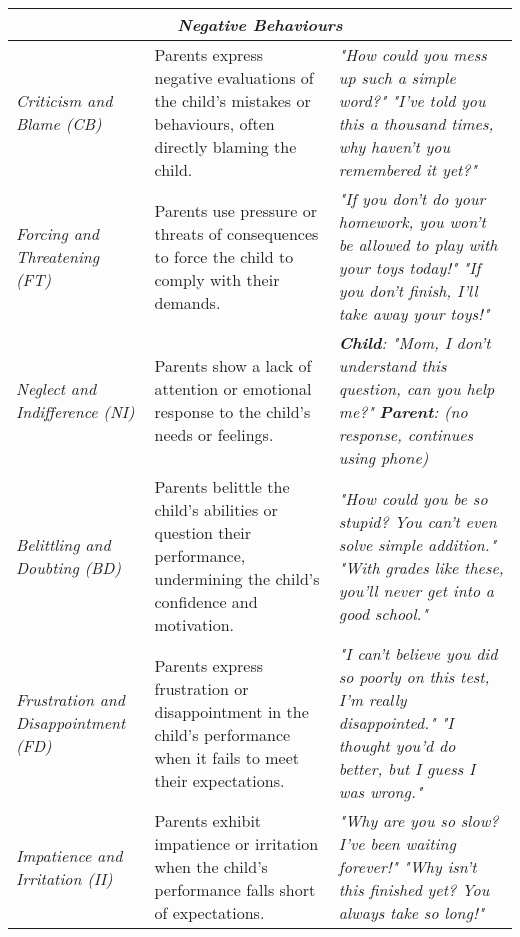 \begin{table}
\begin{tabular}{p{} p{} p{}}
\multicolumn{3}{c}{\textbf{\textit{Negative Behaviours}}}   \\\midrule
\textit{Criticism and \newline Blame (CB)} & Parents express negative evaluations of the child's mistakes or behaviours, often directly blaming the child. & \textit{"How could you mess up such a simple word?"} \newline \textit{"I've told you this a thousand times, why haven't you remembered it yet?"} \\ \hline
\textit{Forcing and \newline Threatening (FT)} & Parents use pressure or threats of consequences to force the child to comply with their demands. & \textit{"If you don't do your homework, you won't be allowed to play with your toys today!"} \newline \textit{"If you don't finish, I'll take away your toys!"} \\ \hline
\textit{Neglect and \newline Indifference (NI)} & Parents show a lack of attention or emotional response to the child's needs or feelings. & \textit{\textbf{Child}: "Mom, I don't understand this question, can you help me?"} \newline \textit{\textbf{Parent}: (no response, continues using phone)} \\ \hline
\textit{Belittling and \newline Doubting (BD)} & Parents belittle the child's abilities or question their performance, undermining the child's confidence and motivation. & \textit{"How could you be so stupid? You can't even solve simple addition."} \newline \textit{"With grades like these, you'll never get into a good school."} \\ \hline
\textit{Frustration and \newline Disappointment (FD)} & Parents express frustration or disappointment in the child's performance when it fails to meet their expectations. & \textit{"I can't believe you did so poorly on this test, I'm really disappointed."} \newline \textit{"I thought you'd do better, but I guess I was wrong."} \\ \hline
\textit{Impatience and \newline Irritation (II)} & Parents exhibit impatience or irritation when the child's performance falls short of expectations. & \textit{"Why are you so slow? I've been waiting forever!"} \newline \textit{"Why isn't this finished yet? You always take so long!"} \\ \bottomrule
\end{tabular}
\end{table}

